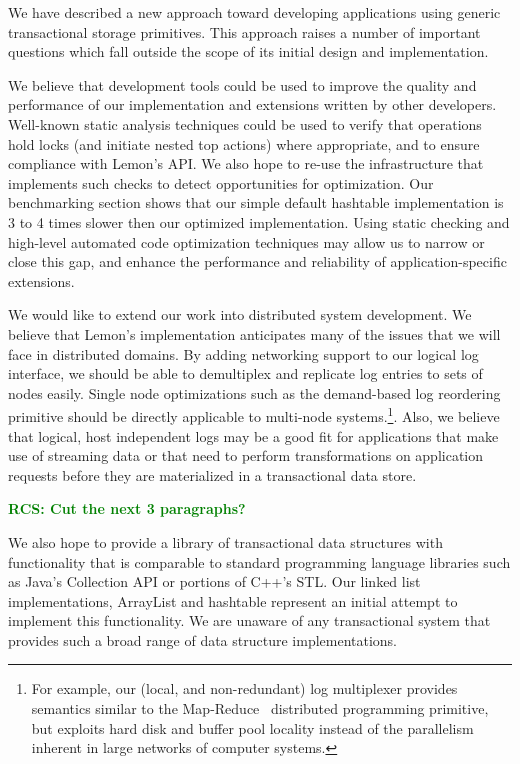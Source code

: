 \documentclass[10pt,letterpaper,twocolumn,english]{article}
\newcommand{\yad}{Lemon\xspace}
\newcommand{\rcs}[1]{\textcolor{green}{\bf RCS: #1}}
\begin{document}
We have described a new approach toward developing applications using
generic transactional storage primitives.  This approach raises a
number of important questions which fall outside the scope of its
initial design and implementation.


We believe that development tools could be used to
improve the quality and performance of our implementation and
extensions written by other developers.  Well-known static analysis
techniques could be used to verify that operations hold locks (and
initiate nested top actions) where appropriate, and to ensure
compliance with \yad's API.  We also hope to re-use the infrastructure
that implements such checks to detect opportunities for
optimization.  Our benchmarking section shows that our simple default
hashtable implementation is 3 to 4 times slower then our optimized
implementation.  Using static checking and high-level automated code
optimization techniques may allow us to narrow or close this
gap, and enhance the performance and reliability of application-specific 
extensions.

We would like to extend our work into distributed system
development.  We believe that \yad's implementation anticipates many
of the issues that we will face in distributed domains.  By adding 
networking support to our logical log interface,
we should be able to demultiplex and replicate log entries to sets of
nodes easily.  Single node optimizations such as the demand-based log
reordering primitive should be directly applicable to multi-node
systems.\footnote{For example, our (local, and non-redundant) log
multiplexer provides semantics similar to the
Map-Reduce~\cite{mapReduce} distributed programming primitive, but
exploits hard disk and buffer pool locality instead of the parallelism
inherent in large networks of computer systems.}.  Also, we believe
that logical, host independent logs may be a good fit for applications
that make use of streaming data or that need to perform
transformations on application requests before they are materialized
in a transactional data store.

\rcs{ Cut the next 3 paragraphs? }

We also hope to provide a library of
transactional data structures with functionality that is comparable to
standard programming language libraries such as Java's Collection API
or portions of C++'s STL.  Our linked list implementations, ArrayList
 and hashtable represent an initial attempt to implement
this functionality.  We are unaware of any transactional system that
provides such a broad range of data structure implementations.  
\end{document}
